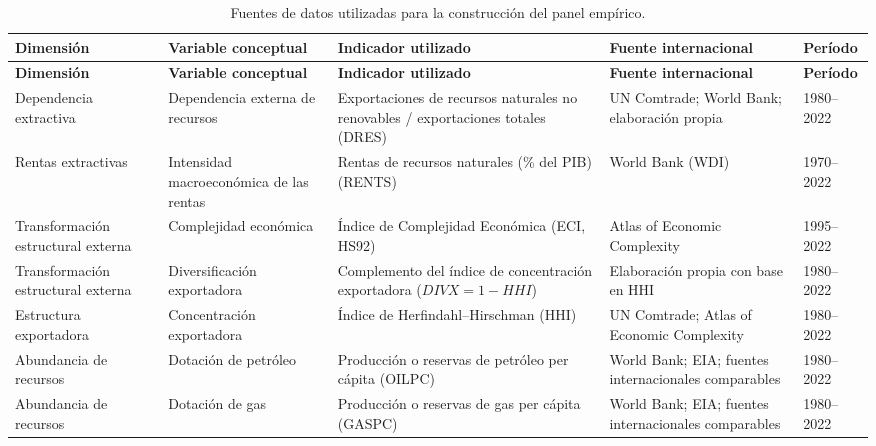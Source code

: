 \documentclass[../../PTFM.tex]{subfiles}
\begin{document}
	\begin{footnotesize}
		\begin{longtable}{
				L{2.35cm}
				L{2.5cm}
				L{3.8cm}
				L{3.25cm}
				L{1.6cm}
			}

			\caption[Fuentes de datos para el panel empírico]{Fuentes de datos utilizadas para la construcción del panel empírico.}

			\label{tab:fuentes_datos} \\
			\hline
			\textbf{Dimensión} & \textbf{Variable conceptual} & \textbf{Indicador utilizado} & \textbf{Fuente internacional} & \textbf{Período} \\
			\hline
			\endfirsthead

			\hline
			\textbf{Dimensión} & \textbf{Variable conceptual} & \textbf{Indicador utilizado} & \textbf{Fuente internacional} & \textbf{Período} \\
			\hline
			\endhead

			Dependencia extractiva
			& Dependencia externa de recursos
			& Exportaciones de recursos naturales no renovables / exportaciones totales (DRES)
			& UN Comtrade; World Bank; elaboración propia
			& 1980--2022 \\

			Rentas extractivas
			& Intensidad macroeconómica de las rentas
			& Rentas de recursos naturales (\% del PIB) (RENTS)
			& World Bank (WDI)
			& 1970--2022 \\

			Transformación estructural externa
			& Complejidad económica
			& Índice de Complejidad Económica (ECI, HS92)
			& Atlas of Economic Complexity
			& 1995--2022 \\

			Transformación estructural externa
			& Diversificación exportadora
			& Complemento del índice de concentración exportadora ($DIVX=1-HHI$)
			& Elaboración propia con base en HHI
			& 1980--2022 \\

			Estructura exportadora
			& Concentración exportadora
			& Índice de Herfindahl--Hirschman (HHI)
			& UN Comtrade; Atlas of Economic Complexity
			& 1980--2022 \\

			Abundancia de recursos
			& Dotación de petróleo
			& Producción o reservas de petróleo per cápita (OILPC)
			& World Bank; EIA; fuentes internacionales comparables
			& 1980--2022 \\

			Abundancia de recursos
			& Dotación de gas
			& Producción o reservas de gas per cápita (GASPC)
			& World Bank; EIA; fuentes internacionales comparables
			& 1980--2022 \\


\end{longtable}
\end{footnotesize}
\end{document}
